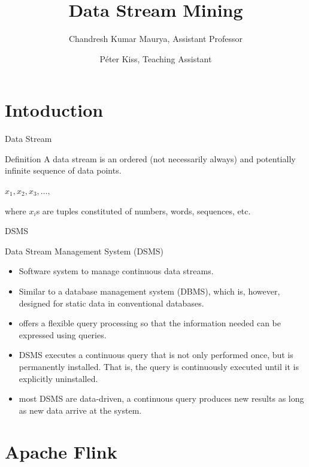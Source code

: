 \documentclass[blue]{beamer}
\title{Data Stream Mining}
\author[Chandresh]{Chandresh Kumar Maurya, Assistant Professor}
\author[Peter]{P\'eter Kiss, Teaching Assistant}
\institute{E\"otv\"os Lor\'and University, Budapest, Hungary}
\begin{document}
\maketitle





\section{Intoduction}

\begin{frame}{Data Stream }
\begin{block}{Definition}
A data stream is an ordered (not necessarily always) and potentially infinite sequence of data points.
\begin{center}
    $x_1,x_2, x_3,\ldots,$
\end{center}
where $x_i$s are tuples constituted of numbers, words, sequences, etc.
\end{block}

\end{frame}


\begin{frame}{DSMS}
\begin{block}{Data Stream Management System (DSMS)}
\begin{itemize}
    \item Software system to manage continuous data streams. 
 
\item Similar to a database management system (DBMS), which is, however, designed for static data in conventional databases.
 
\item offers a flexible query processing so that the information needed can be expressed using queries.

\item  DSMS executes a continuous query that is not only performed once, but is permanently installed. That is, the query is continuously executed until it is explicitly uninstalled. 

\item most DSMS are data-driven, a continuous query produces new results as long as new data arrive at the system. 
\end{itemize}
\end{block}
\end{frame}

\section{Apache Flink}
\end{document}
